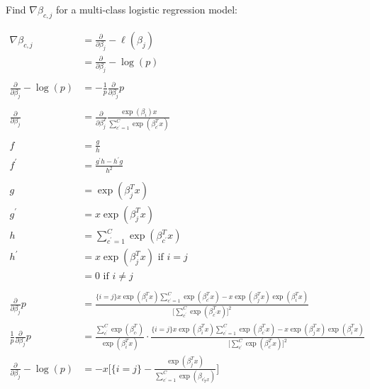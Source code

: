 \documentclass[11pt]{article}
\begin{document}
Find $\nabla \beta_{c,j}$ for a multi-class logistic regression model: 

\begin{align*}
	\nabla \beta_{c,j} &= \frac{\partial}{\partial \beta_{j}} -\ell(\beta_{j})\\
	&= \frac{\partial}{\partial \beta_{j}} -\log(p)\\
	\\
	\frac{\partial}{\partial \beta_{j}} -\log(p) &= -\frac{1}{p} \frac{\partial}{\partial \beta_{j}}p\\
	\\
	\frac{\partial}{\partial \beta_{j}} &= \frac{\partial}{\partial \beta_{j}^{T}} \frac{\exp(\beta_{i})x}{\sum_{c^{\prime}=1}^{C}\exp(\beta_{c^{\prime}}^{T}x)}\\
	\\
	f &= \frac{g}{h}\\
	f^{\prime}&=\frac{g^{\prime}h-h^{\prime}g}{h^{2}}\\
	\\
	g &= \exp(\beta_{j}^{T}x)\\
	g^{\prime} &= x\exp(\beta_{j}^{T}x)\\
	h &= \sum_{c^{\prime}=1}^{C}\exp(\beta_{c^{\prime}}^{T}x)\\
	h^{\prime} &= x\exp(\beta_{j}^{T}x) \text{ if } i = j\\
	&= 0 \text{ if } i \neq j\\
	\\
	\frac{\partial}{\partial \beta_{j}}p &= \frac{\{i=j\}x \exp(\beta_{i}^{T}x)\sum_{c^{\prime}=1}^{C} \exp(\beta_{c^{\prime}}^{T}x)-x \exp(\beta_{j}^{T}x) \exp(\beta_{i}^{T}x)}{\big[\sum_{c^{\prime}}^{C} \exp(\beta_{c^{\prime}}^{T}x)\big]^{2}}\\
	\frac{1}{p}\frac{\partial}{\partial \beta_{j}}p &= \frac{\sum_{c^{\prime}}^{C} \exp(\beta_{c_{\prime}}^{T})}{\exp(\beta_{i}^{T}x)} \cdot \frac{\{i=j\}x \exp(\beta_{i}^{T}x)\sum_{c^{\prime}=1}^{C} \exp(\beta_{c^{\prime}}^{T}x)-x \exp(\beta_{j}^{T}x) \exp(\beta_{i}^{T}x)}{\big[\sum_{c^{\prime}}^{C} \exp(\beta_{c^{\prime}}^{T}x)\big]^{2}}\\
	\frac{\partial}{\partial \beta_{j}} -\log(p) &= -x \bigg[\{i=j\}-\frac{\exp(\beta_{j}^{T}x)}{\sum_{c^{\prime}=1}^{C} \exp(\beta_{c^{\prime}_{T}x})} \bigg]\\
\end{align*}
\end{document}
